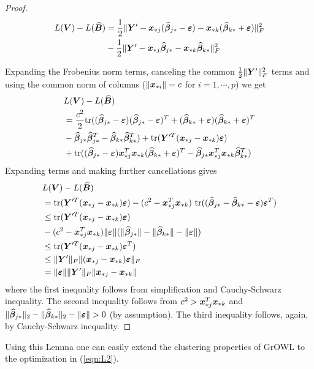 \begin{proof}


\begin{align*}
L(\bV) - L(\widehat{\bB})
& = \frac{1}{2}\|\bY' - \bx_{\a j} (\widehat\bbeta_{j \a} -\be) - \bx_{\a k} (\widehat\bbeta_{k \a} + \be)\|_F^2 \\
&-  \frac{1}{2}\|\bY' - \bx_{\a j} \widehat\bbeta_{j \a} - \bx_{\a k} \widehat\bbeta_{k \a}\|_F^2
\end{align*}

Expanding the Frobenius norm terms, canceling the common $\frac{1}{2}\|\bY'\|_F^2$ terms  and using the common norm of columns ($\|\bx_{\a i}\| = c$ for $i = 1,\cdots,p$) we get
\begin{align*}
&L(\bV) - L(\widehat{\bB}) \\
& = \frac{c^2}{2} \textnormal{tr}( (\widehat\bbeta_{j \a}-\be) (\widehat\bbeta_{j \a}-\be)^T + (\widehat\bbeta_{k \a}+\be) (\widehat\bbeta_{k \a}+\be)^T\\
& - \widehat\bbeta_{j \a} \widehat\bbeta_{j \a}^T - \widehat\bbeta_{k \a} \widehat\bbeta_{k \a}^T)  + \textnormal{tr}(\bY'^T (\bx_{\a j} - \bx_{\a k}) \be) \\
&+ \textnormal{tr}( (\widehat\bbeta_{j \a}-\be) \bx_{\a j}^T \bx_{\a k} (\widehat\bbeta_{k \a}+\be)^T - \widehat\bbeta_{j \a} \bx_{\a j}^T  \bx_{\a k} \widehat\bbeta_{k \a}^T)
\end{align*}
Expanding terms and making further cancellations gives
\begin{align*}
&L(\bV) - L(\widehat{\bB}) \\
& = \textnormal{tr}(\bY'^T (\bx_{\a j} - \bx_{\a k}) \be) -(c^2 - \bx_{\a j}^T \bx_{\a k}) \textnormal{ tr}((  \widehat\bbeta_{j \a} - \widehat\bbeta_{k \a} - \be) \be^T)\\ 
& \leq \textnormal{tr}(\bY'^T (\bx_{\a j} - \bx_{\a k}) \be) \\
& - (c^2 - \bx_{\a j}^T  \bx_{\a k}) \|\be\| (\|\widehat\bbeta_{j \a}\| - \|\widehat\bbeta_{k \a}\| - \|\be\|)\\
& \leq \textnormal{tr}(\bY'^T (\bx_{\a j} - \bx_{\a k}) \be^T) \\
& \leq \|\bY'\|_F \|(\bx_{\a j} - \bx_{\a k}) \be\|_F \\
& = \|\be\|  \|\bY'\|_F \| \bx_{\a j} - \bx_{\a k} \|
\end{align*}
where the first inequality follows from simplification and Cauchy-Schwarz inequality. The second inequality follows from $c^2 > \bx_{\a j}^T \bx_{\a k} $ and $\|\widehat\bbeta_{j \a}\|_2 - \|\widehat\bbeta_{k \a}\|_2 - \|\be\| > 0$ (by assumption). The third inequality follows, again, by Cauchy-Schwarz inequality.

\end{proof}

Using this Lemma one can easily extend the clustering properties of GrOWL to the optimization in (\ref{eqn:L2}).
